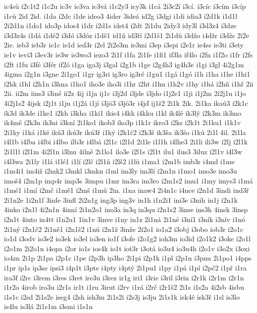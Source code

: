 {ic4sů
i2c1t2
i1c2u
ic3v
ic3va
ic3vá
i1c2y3
icy3k
i1cá
2i3c2í
i3cí.
i3cíc
i3cím
i3cíp
i1ců
2id
2id.
i1da
i2dc
i1de
ideo3
4ider
3ideá
id2g
i3dgi
i1di
idia3
i2d1k
i1d1l
2i2d1n
i1do1
ido3p
idos4
i1dr
i2d1s
idst4
i2dt
2i1du
2idy3
idy3l
i3d3z4
i3dze
i3d3z4s
i1dá
i1dé2
i3dó
i3dóz
i1dě1
id1ň
id3ří
i2d1š1
2i1dů
i3džo
i4džr
i3džs
2i2e
2ie.
ieb3
ieb3r
ie1c
ie1d
ied3r
i2el
2i2e3m
ie3mi
i3ep
i3epi
i2e1r
ie4ss
ie3ti
i3ety
ie1v
ievi3
i3ev3r
ie3w
ie3wo3
iezo3
2i1f
i1fa
2i1fe
i1fi1
if3la
if4lo
i2fn
i1f2o
i1fr
i2fs
i2ft
i1fu
i3fé
i3fér
if2ó
i1ga
iga3j
i3gal
i2g1b
i1ge
i2g4h3
ig4h3e
i1gi
i3gl
4i2g1m
4igma
i2g1n
i3gne
2i1go1
i1gr
ig3ri
ig3ro
ig3ré
i1gu1
i1gá
i1gó
i1h
i1ha
i1he
i1hi1
i2hk
i1hl
i2h1n
i3hna
i1ho1
iho3e
iho3i
i1hr
i2ht
i1hu
i1h2v
i1hy
i1há
i2hň
i1hř
2ii
2ii.
ii2m
iins3
i3ině
ii2z
4ij
i1ja
ij1c
i3j2d
i3jde
i3jdo
i1j2e1
i1ji
i1j2m
2i2j1n
i1jo
4i2j1s2
4ijsk
i2j1t
i1ju
i1j2á
i1jí
i3jö3
i3jö3r
i4jď
ij1š2
2i1k
2ik.
2i1ka
ikaú3
i2k1c
ik3d
ik3de
i1ke1
i2kh
i3kha
i1ki1
ikis4
i4kk
i4kku
i1kl
ik4lé
ik3lý
i2k3m
ik3mo
ik4mě
i2k3n
ik3ni
i3kní
2i1ko1
ikob3
iko3p
i1k1r
ikro3
i2ks
i2k1t
2i1ku1
i1k1v
2i1ky
i1ká
i1ké
ikú3
ikú3r
ikú3ř
i1ký
i2k1č2
i2k3š
ik3ša
ik3šo
i1ků
2i1l
4il.
2i1la
i4l1b
i4lba
i4lbi
i4lbo
ilb3r
i4lbá
i2l1c
i2l1d
2i1le
i1l1h
i4lhe3
2i1li
ili3w
i2lj
i2l1k
2i1l1l
i2l1m
4i2l1n
i3lnu
4ilně
2i1lo1
ilo3e
i2l1s
i2l1t
ilu1
ilus3
3iluz
i2l1v
i4l3w
i4l3wa
2i1ly
i1lá
i1lé1
i1lí
i2lč
i2l1ň
i2lš2
i1lů
i1ma1
i2m1b
imb3r
i4md
i1me
i1m4i1
im4iž
i2mk2
i3mkl
i3mkn
i1ml
im3ly
im3lí
i2m1n
i1mo1
imo3e
imo3u
imoš4
i2m1p
imp4r
imp3s
3impu
i1mr
im3ra
im3ro
i2m1s2
imu1
i1my
imys3
i1má
i1mé1
i1mí
i2mč
i1mě1
i2mš
i1mů
2in.
i1na
inaw4
2i4n1c
i4nce
i2n1d
3indi
ind3ř
2i1n2e
1i2n1f
3infe
3infl
2i2n1g
ing3p
ing3v
in1h
i1n2i1
ini3e
i3nih
in1j
i2n1k
4inko
i2n1l
4i2n1n
4inní
2i1n2o1
ino3a
in3q
in3qu
i2n1s2
3inse
ins3h
4insk
3insp
i2n1t
4into
in4tt
i1n2u1
1in1v
3inve
i1ny
in1z
2i1ná
2i1né
i3ní1
i3ník
i3nív
i1nó
2i1ný
i2n1č2
2i1ně1
i2n1š2
i1nů
i2n1ž
3inže
2i2o1
io1a2
i3obj
i3obo
iob3r
i2o1c
io1d
i3odv
io3e2
io3ek
io3el
io3en
io1f
i3ofe
i2o1g2
ioh3m
io3id
i2o1k2
i3oke
i2o1l
i2o1m
2i2o1n
i4opa
i2or
io1s
ios4k
io1t
iot3r
i3otá
io3u4
io3u4h
i2o1v
i3o2x
i3oxi
io4zn
2i1p
2i1pa
i2p1c
i1pe
i2p3h
ip3ho
2i1pi
i2p1k
i1pl
i2p1n
i3pnu
2i1po1
i4pps
i1pr
ip1s
ip3se
ipsi3
i4p1t
i3pte
i4pty
i4ptý
2i1pu1
i1py
i1pá
i1pí
i2pč2
i1př
i1ra
ira3f
i2rc
i3rem
i3res
i3ret
ire3u
i3rez
ir1g
iri1
i3rie
i3ril
i3rin
i2r1k
i2r1m
i2r1n
i1r2o
4irob
iro3u
i2r1s
ir1t
i1ru
3irut
i2rv
i1rá
i2rč
i2r1š2
2i1s
i1s2a
4i2sb
4isbu
i1s1c
i2sd
2i1s2e
iseg4
i2sh
ish3m
2i1s2i
i2s3j
is3ju
2i1s1k
isk4é
isk3ř
i1sl
is3lo
is4lu
is3lá
2i1s1m
i3smi
i1s1n
}
